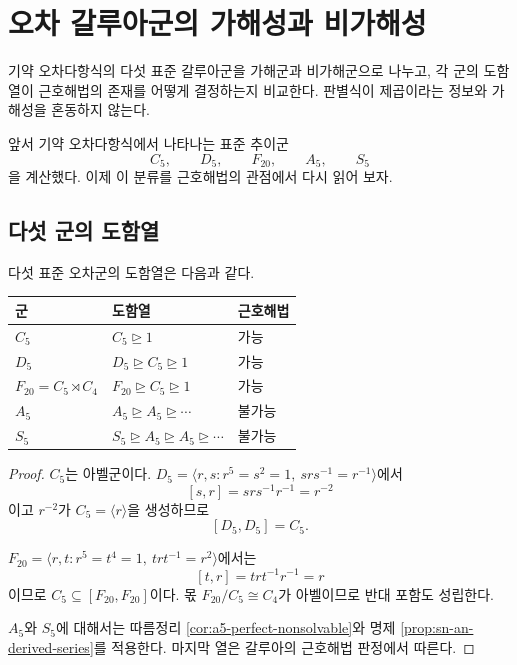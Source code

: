 \clearpage
\section{오차 갈루아군의 가해성과 비가해성}
\label{sec:quintic-solvability-landscape}

\begin{learninggoal}
기약 오차다항식의 다섯 표준 갈루아군을 가해군과 비가해군으로 나누고, 각 군의 도함열이 근호해법의 존재를 어떻게 결정하는지 비교한다. 판별식이 제곱이라는 정보와 가해성을 혼동하지 않는다.
\end{learninggoal}

앞서 기약 오차다항식에서 나타나는 표준 추이군
\[
  C_5,\qquad D_5,\qquad F_{20},\qquad A_5,\qquad S_5
\]
을 계산했다. 이제 이 분류를 근호해법의 관점에서 다시 읽어 보자.

\subsection{다섯 군의 도함열}

\begin{proposition}
\label{prop:five-quintic-groups-solvability}
다섯 표준 오차군의 도함열은 다음과 같다.
\begin{center}
\small
\renewcommand{\arraystretch}{1.25}
\begin{tabular}{lll}
\toprule
군 & 도함열 & 근호해법 \\
\midrule
$C_5$ & $C_5\trianglerighteq1$ & 가능 \\
$D_5$ & $D_5\trianglerighteq C_5\trianglerighteq1$ & 가능 \\
$F_{20}=C_5\rtimes C_4$ & $F_{20}\trianglerighteq C_5\trianglerighteq1$ & 가능 \\
$A_5$ & $A_5\trianglerighteq A_5\trianglerighteq\cdots$ & 불가능 \\
$S_5$ & $S_5\trianglerighteq A_5\trianglerighteq A_5\trianglerighteq\cdots$ & 불가능 \\
\bottomrule
\end{tabular}
\end{center}
\end{proposition}

\begin{proof}
$C_5$는 아벨군이다. $D_5=\langle r,s:r^5=s^2=1,\ srs^{-1}=r^{-1}\rangle$에서
\[
  [s,r]=srs^{-1}r^{-1}=r^{-2}
\]
이고 $r^{-2}$가 $C_5=\langle r\rangle$을 생성하므로
\[
  [D_5,D_5]=C_5.
\]

$F_{20}=\langle r,t:r^5=t^4=1,\ trt^{-1}=r^2\rangle$에서는
\[
  [t,r]=trt^{-1}r^{-1}=r
\]
이므로 $C_5\subseteq[F_{20},F_{20}]$이다. 몫 $F_{20}/C_5\cong C_4$가 아벨이므로 반대 포함도 성립한다.

$A_5$와 $S_5$에 대해서는 따름정리 \ref{cor:a5-perfect-nonsolvable}와 명제 \ref{prop:sn-an-derived-series}를 적용한다. 마지막 열은 갈루아의 근호해법 판정에서 따른다.
\end{proof}

